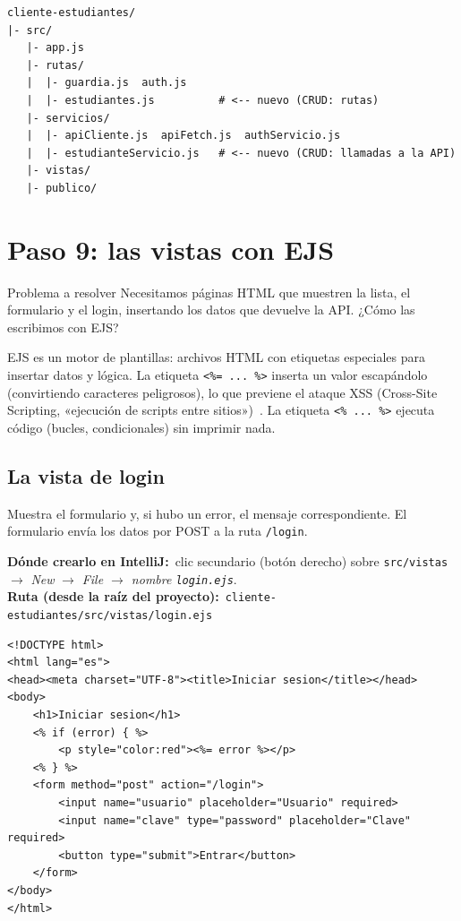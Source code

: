 \documentclass[11pt]{article}
\newcommand{\dondecrear}[3]{\begin{ubic}{\footnotesize\textbf{\color{ndverdeo}D\'onde crearlo en IntelliJ:}~clic secundario (bot\'on derecho) sobre \texttt{#1} $\rightarrow$ \emph{New} $\rightarrow$ \emph{#2}.\\[2pt]\textbf{\color{ndverdeo}Ruta (desde la ra\'iz del proyecto):}~\texttt{#3}}\end{ubic}\nobreak\vspace{3pt}}
\begin{document}
\begin{cajacodigo}
\begin{lstlisting}[style=markup]
cliente-estudiantes/
|- src/
   |- app.js
   |- rutas/
   |  |- guardia.js  auth.js
   |  |- estudiantes.js          # <-- nuevo (CRUD: rutas)
   |- servicios/
   |  |- apiCliente.js  apiFetch.js  authServicio.js
   |  |- estudianteServicio.js   # <-- nuevo (CRUD: llamadas a la API)
   |- vistas/
   |- publico/
\end{lstlisting}
\end{cajacodigo}
\vspace{2pt}

\section{Paso 9: las vistas con EJS}
\begin{cajaproblema}{Problema a resolver}
Necesitamos páginas HTML que muestren la lista, el formulario y el login, insertando los datos que devuelve la API. ¿Cómo las escribimos con EJS?\par
\end{cajaproblema}
EJS es un motor de plantillas: archivos HTML con etiquetas especiales para insertar datos y lógica. La etiqueta \texttt{<\%= ... \%>} inserta un valor escapándolo (convirtiendo caracteres peligrosos), lo que previene el ataque XSS (Cross-Site Scripting, «ejecución de scripts entre sitios»)~\citep{owasp2021top10}. La etiqueta \texttt{<\% ... \%>} ejecuta código (bucles, condicionales) sin imprimir nada.

\subsection{La vista de login}
Muestra el formulario y, si hubo un error, el mensaje correspondiente. El formulario envía los datos por POST a la ruta \texttt{/login}.

\dondecrear{src/vistas}{File $\rightarrow$ nombre \texttt{login.ejs}}{cliente-estudiantes/src/vistas/login.ejs}
\begin{cajacodigo}
\begin{lstlisting}[style=markup]
<!DOCTYPE html>
<html lang="es">
<head><meta charset="UTF-8"><title>Iniciar sesion</title></head>
<body>
	<h1>Iniciar sesion</h1>
	<% if (error) { %>
		<p style="color:red"><%= error %></p>
	<% } %>
	<form method="post" action="/login">
		<input name="usuario" placeholder="Usuario" required>
		<input name="clave" type="password" placeholder="Clave" required>
		<button type="submit">Entrar</button>
	</form>
</body>
</html>
\end{lstlisting}
\end{cajacodigo}
\vspace{2pt}
\end{document}
